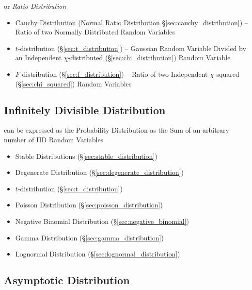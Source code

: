 or \emph{Ratio Distribution}

\begin{itemize}
  \item Cauchy Distribution (Normal Ratio Distribution
    \S\ref{sec:cauchy_distribution}) -- Ratio of two Normally Distributed Random
    Variables
  \item $t$-distribution (\S\ref{sec:t_distribution}) -- Gaussian Random
    Variable Divided by an Independent $\chi$-distributed
    (\S\ref{sec:chi_distribution}) Random Variable
  \item $F$-distribution (\S\ref{sec:f_distribution}) -- Ratio of two
    Independent $\chi$-squared (\S\ref{sec:chi_squared}) Random Variables
\end{itemize}



\subsection{Infinitely Divisible Distribution}
\label{sec:infinitely_divisible}

can be expressed as the Probability Distribution as the Sum of an arbitrary
number of IID Random Variables

\begin{itemize}
  \item Stable Distributions (\S\ref{sec:stable_distribution})
  \item Degenerate Distribution (\S\ref{sec:degenerate_distribution})
  \item $t$-distribution (\S\ref{sec:t_distribution})
  \item Poisson Distribution (\S\ref{sec:poisson_distribution})
  \item Negative Binomial Distribution (\S\ref{sec:negative_binomial})
  \item Gamma Distribution (\S\ref{sec:gamma_distribution})
  \item Lognormal Distribution (\S\ref{sec:lognormal_distribution})
\end{itemize}



\subsection{Asymptotic Distribution}\label{sec:asymptotic_distribution}

